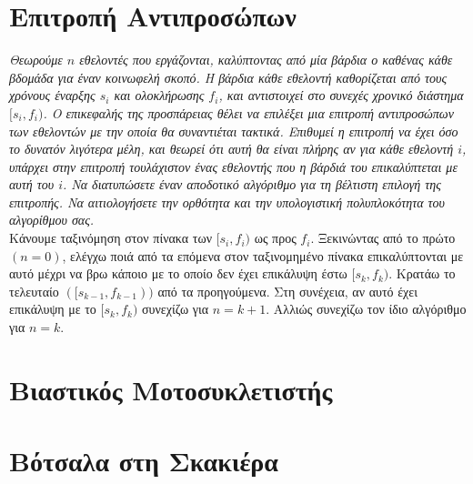 \documentclass[a4paper,10pt]{article} \usepackage{anysize}
\begin{document}
\renewcommand{\labelenumi}{\roman{enumi})}
\renewcommand{\labelenumii}{(\arabic{enumii})}



\section{Επιτροπή Αντιπροσώπων} \setcounter{section}{1}
\textit{Θεωρούμε $n$ εθελοντές που εργάζονται, καλύπτοντας από μία βάρδια ο καθένας
κάθε βδομάδα για έναν κοινωφελή σκοπό. Η βάρδια κάθε εθελοντή καθορίζεται από
τους χρόνους έναρξης $s_i$ και ολοκλήρωσης $f_i$, και αντιστοιχεί στο συνεχές
χρονικό διάστημα $[s_i,f_i)$. Ο επικεφαλής της προσπάρειας θέλει να επιλέξει
μια επιτροπή αντιπροσώπων των εθελοντών με την οποία θα συναντιέται τακτικά.
Επιθυμεί η επιτροπή να έχει όσο το δυνατόν λιγότερα μέλη, και θεωρεί ότι αυτή
θα είναι πλήρης αν για κάθε εθελοντή $i$, υπάρχει στην επιτροπή τουλάχιστον
ένας εθελοντής που η βάρδιά του επικαλύπτεται με αυτή του $i$. Να διατυπώσετε
έναν αποδοτικό αλγόριθμο για τη βέλτιστη επιλογή της επιτροπής. Να
αιτιολογήσετε την ορθότητα και την υπολογιστική πολυπλοκότητα του αλγορίθμου
σας.}\\[0.2cm]

Κάνουμε ταξινόμηση στον πίνακα των $[s_i,f_i)$ ως προς $f_i$. Ξεκινώντας από
 το πρώτο $(n=0)$, ελέγχω ποιά από τα επόμενα στον ταξινομημένο πίνακα επικαλύπτονται
με αυτό μέχρι να βρω κάποιο με το οποίο δεν έχει επικάλυψη έστω $[s_k,f_k)$. Κρατάω
το τελευταίο $([s_{k-1},f_{k-1}))$ από τα προηγούμενα. Στη συνέχεια, αν αυτό έχει
επικάλυψη με το $[s_k,f_k)$ συνεχίζω για $n=k+1$. Αλλιώς συνεχίζω
τον ίδιο αλγόριθμο για $n=k$.





\vspace{3cm}

\section{Βιαστικός Μοτοσυκλετιστής}


\vspace{3cm}

\section{Βότσαλα στη Σκακιέρα}
\end{document}
